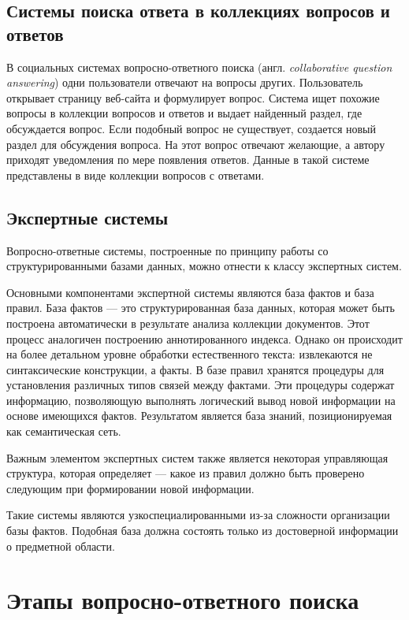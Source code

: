 \subsection{Системы поиска ответа в коллекциях вопросов и ответов}

В социальных системах вопросно-ответного поиска (англ. \textit{collaborative question answering}) одни пользователи отвечают на вопросы других. Пользователь открывает страницу веб-сайта и формулирует вопрос. Система ищет похожие вопросы в коллекции вопросов и ответов и выдает найденный раздел, где обсуждается вопрос. Если подобный вопрос не существует, создается новый раздел для обсуждения вопроса. На этот вопрос отвечают желающие, а автору приходят уведомления по мере появления ответов. Данные в такой системе представлены в виде коллекции вопросов с ответами.

\subsection{Экспертные системы}

Вопросно-ответные системы, построенные по принципу работы со структурированными базами
данных, можно отнести к классу экспертных систем. 

Основными компонентами экспертной системы являются база фактов и база правил. 
База фактов --- это структурированная база данных, которая может быть построена
автоматически в результате анализа коллекции документов. Этот процесс аналогичен
построению аннотированного индекса. Однако он происходит на более детальном уровне
обработки естественного текста: извлекаются не синтаксические конструкции, а факты. В базе правил хранятся процедуры для установления различных типов связей между фактами. Эти процедуры содержат информацию, позволяющую выполнять логический вывод новой информации на основе имеющихся фактов. Результатом является база знаний, позиционируемая как семантическая сеть.

Важным элементом экспертных систем также является некоторая управляющая структура, которая определяет --- какое из правил должно быть проверено следующим при формировании новой информации.

Такие системы являются узкоспециалированными из-за сложности организации базы фактов. Подобная база должна состоять только из достоверной информации о предметной области. 

\section{Этапы вопросно-ответного поиска}

